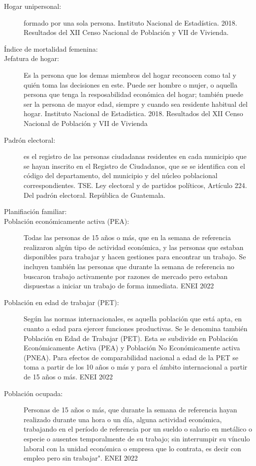 \begin{description}
	\item[Hogar unipersonal:] formado por una sola persona. Instituto Nacional de Estadística. 2018. Resultados del XII Censo Nacional de Población y VII de Vivienda.
	\item[Índice de mortalidad femenina:] 
	\item[Jefatura de hogar:] Es la persona que los demas miembros del hogar reconocen como tal y quién toma las decisiones en este. Puede ser hombre o mujer, o aquella persona que tenga la resposabilidad económica del hogar; también puede ser la persona de mayor edad, siempre y cuando sea residente habitual del hogar. Instituto Nacional de Estadística. 2018. Resultados del XII Censo Nacional de Población y VII de Vivienda
	\item[Padrón electoral:]  es el registro de las personas ciudadanas residentes en cada municipio que se hayan inscrito en el Registro de Ciudadanos, que se se identifica con el código del departamento, del municipio y del núcleo poblacional correspondientes. TSE. Ley electoral y de partidos políticos, Artículo 224. Del padrón electoral. República de Guatemala.
	\item[Planifiación familiar:] 
	\item[Población económicamente activa (PEA):] Todas las personas de 15 años o más, que en la semana de referencia realizaron algún tipo de actividad económica, y las personas que estaban disponibles para trabajar y hacen gestiones para encontrar un trabajo. Se incluyen también las personas que durante la semana de referencia no buscaron trabajo activamente por razones de mercado pero estaban dispuestas a iniciar un trabajo de forma inmediata. ENEI 2022
	\item[Población en edad de trabajar (PET):] Según las normas internacionales, es aquella población que está apta, en cuanto a edad para ejercer funciones productivas. Se le denomina también Población en Edad de Trabajar (PET). Esta se subdivide en Población Económicamente Activa (PEA) y Población No Económicamente activa (PNEA). Para efectos de comparabilidad nacional a edad de la PET se toma a partir de los 10 años o más y para el ámbito internacional a partir de 15 años o más. ENEI 2022
	\item[Población ocupada:] Personas de 15 años o más, que durante la semana de referencia hayan realizado durante una hora o un día, alguna actividad económica, trabajando en el período de referencia por un sueldo o salario en metálico o especie o ausentes temporalmente de su trabajo; sin interrumpir su vínculo laboral con la unidad económica o empresa que lo contrata, es decir con empleo pero sin trabajar". ENEI 2022

\end{description}
